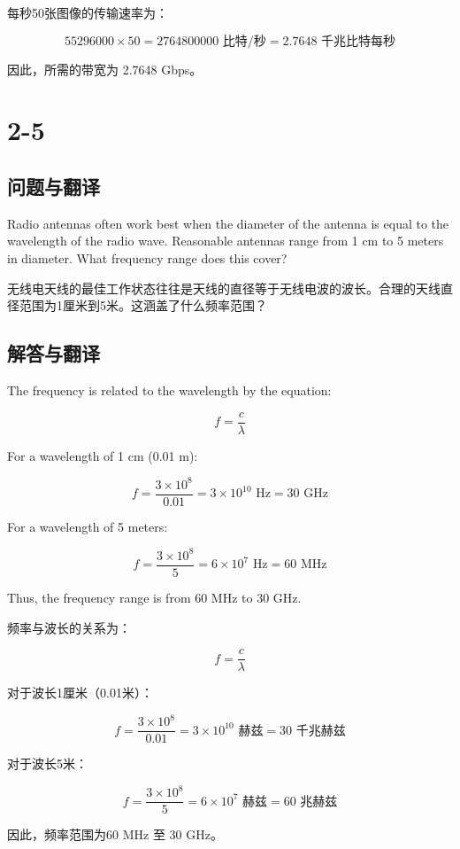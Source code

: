 每秒50张图像的传输速率为：

\[
55296000 \times 50 = 2764800000 \text{ 比特/秒} = 2.7648 \text{ 千兆比特每秒}
\]

因此，所需的带宽为 2.7648 Gbps。

\section{2-5}

\subsection{问题与翻译}

Radio antennas often work best when the diameter of the antenna is equal to the wavelength of the radio wave. Reasonable antennas range from 1 cm to 5 meters in diameter. What frequency range does this cover?

无线电天线的最佳工作状态往往是天线的直径等于无线电波的波长。合理的天线直径范围为1厘米到5米。这涵盖了什么频率范围？

\subsection{解答与翻译}

The frequency is related to the wavelength by the equation:

\[
f = \frac{c}{\lambda}
\]

For a wavelength of 1 cm (0.01 m):

\[
f = \frac{3 \times 10^8}{0.01} = 3 \times 10^{10} \text{ Hz} = 30 \text{ GHz}
\]

For a wavelength of 5 meters:

\[
f = \frac{3 \times 10^8}{5} = 6 \times 10^7 \text{ Hz} = 60 \text{ MHz}
\]

Thus, the frequency range is from 60 MHz to 30 GHz.

\vspace{10pt}

频率与波长的关系为：

\[
f = \frac{c}{\lambda}
\]

对于波长1厘米（0.01米）：

\[
f = \frac{3 \times 10^8}{0.01} = 3 \times 10^{10} \text{ 赫兹} = 30 \text{ 千兆赫兹}
\]

对于波长5米：

\[
f = \frac{3 \times 10^8}{5} = 6 \times 10^7 \text{ 赫兹} = 60 \text{ 兆赫兹}
\]

因此，频率范围为60 MHz 至 30 GHz。


